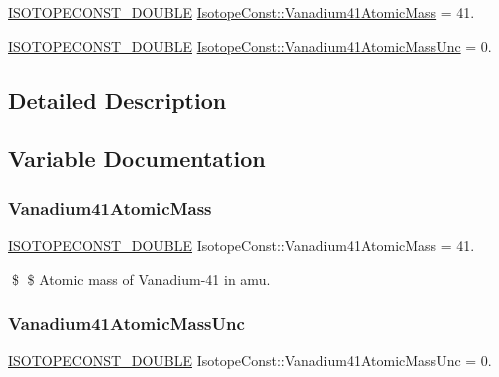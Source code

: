 \begin{DoxyCompactItemize}
\item 
\mbox{\hyperlink{group___isotope_const-_macros_ga8f45a7272ce02c0b4c65c44636ed719a}{I\+S\+O\+T\+O\+P\+E\+C\+O\+N\+S\+T\+\_\+\+D\+O\+U\+B\+LE}} \mbox{\hyperlink{group___isotope_const-_vanadium-_v41_gadcaeddb71b336ee30c152410765e9e4a}{Isotope\+Const\+::\+Vanadium41\+Atomic\+Mass}} = 41.
\item 
\mbox{\hyperlink{group___isotope_const-_macros_ga8f45a7272ce02c0b4c65c44636ed719a}{I\+S\+O\+T\+O\+P\+E\+C\+O\+N\+S\+T\+\_\+\+D\+O\+U\+B\+LE}} \mbox{\hyperlink{group___isotope_const-_vanadium-_v41_gab5dd933a5c625d5d2e195cc87fa1bed4}{Isotope\+Const\+::\+Vanadium41\+Atomic\+Mass\+Unc}} = 0.
\end{DoxyCompactItemize}


\subsection{Detailed Description}


\subsection{Variable Documentation}
\mbox{\label{group___isotope_const-_vanadium-_v41_gadcaeddb71b336ee30c152410765e9e4a}} 
\subsubsection{\texorpdfstring{Vanadium41\+Atomic\+Mass}{Vanadium41AtomicMass}}
{\footnotesize\ttfamily \mbox{\hyperlink{group___isotope_const-_macros_ga8f45a7272ce02c0b4c65c44636ed719a}{I\+S\+O\+T\+O\+P\+E\+C\+O\+N\+S\+T\+\_\+\+D\+O\+U\+B\+LE}} Isotope\+Const\+::\+Vanadium41\+Atomic\+Mass = 41.}

\$ \$ Atomic mass of Vanadium-\/41 in amu. \mbox{\label{group___isotope_const-_vanadium-_v41_gab5dd933a5c625d5d2e195cc87fa1bed4}} 
\subsubsection{\texorpdfstring{Vanadium41\+Atomic\+Mass\+Unc}{Vanadium41AtomicMassUnc}}
{\footnotesize\ttfamily \mbox{\hyperlink{group___isotope_const-_macros_ga8f45a7272ce02c0b4c65c44636ed719a}{I\+S\+O\+T\+O\+P\+E\+C\+O\+N\+S\+T\+\_\+\+D\+O\+U\+B\+LE}} Isotope\+Const\+::\+Vanadium41\+Atomic\+Mass\+Unc = 0.}

